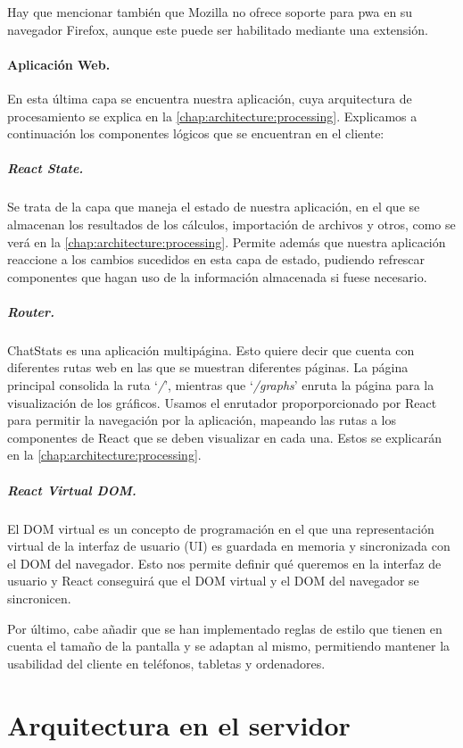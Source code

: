 Hay que mencionar también que Mozilla no ofrece soporte para \acrshort{pwa} en su navegador Firefox\cite{firefoxNoPWA}, aunque este puede ser habilitado mediante una extensión\cite{firefoxPWAextension}.

\paragraph{Aplicación Web.} En esta última capa se encuentra nuestra aplicación, cuya arquitectura de procesamiento se explica en la \autoref{chap:architecture:processing}. Explicamos a continuación los componentes lógicos que se encuentran en el cliente:

\subparagraph{React State.} Se trata de la capa que maneja el estado de nuestra aplicación, en el que se almacenan los resultados de los cálculos, importación de archivos y otros, como se verá en la \autoref{chap:architecture:processing}. Permite además que nuestra aplicación reaccione a los cambios sucedidos en esta capa de estado, pudiendo refrescar componentes que hagan uso de la información almacenada si fuese necesario.

\subparagraph{Router.} ChatStats es una aplicación multipágina. Esto quiere decir que cuenta con diferentes rutas web en las que se muestran diferentes páginas. La página principal consolida la ruta `\textit{/}', mientras que `\textit{/graphs}' enruta la página para la visualización de los gráficos. Usamos el enrutador proporporcionado por React para permitir la navegación por la aplicación, mapeando las rutas a los componentes de React que se deben visualizar en cada una. Estos se explicarán en la \autoref{chap:architecture:processing}.

\subparagraph{React Virtual DOM.} El DOM virtual es un concepto de programación en el que una representación virtual de la interfaz de usuario (UI) es guardada en memoria y sincronizada con el DOM del navegador. Esto nos permite definir qué queremos en la interfaz de usuario y React conseguirá que el DOM virtual y el DOM del navegador se sincronicen.


Por último, cabe añadir que se han implementado reglas de estilo que tienen en cuenta el tamaño de la pantalla y se adaptan al mismo, permitiendo mantener la usabilidad del cliente en teléfonos, tabletas y ordenadores.





\section{Arquitectura en el servidor}
\label{chap:architecture:server}

